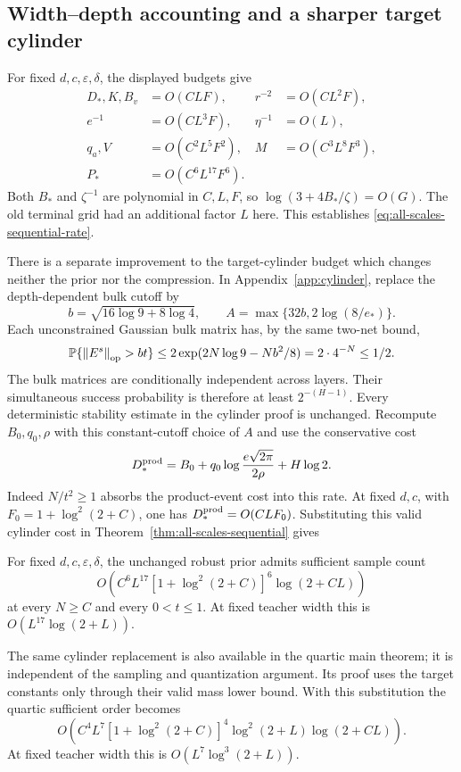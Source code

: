 \subsection{Width--depth accounting and a sharper target cylinder}

For fixed $d,c,\varepsilon,\delta$, the displayed budgets give
\begin{align*}
 D_*,K,B_v&=O(CLF),&r^{-2}&=O(CL^2F),\\
 e^{-1}&=O(CL^3F),&\eta^{-1}&=O(L),\\
 q_a,V&=O(C^2L^5F^2),&M&=O(C^3L^8F^3),\\
 P_*&=O(C^6L^{17}F^6).
\end{align*}
Both $B_*$ and $\zeta^{-1}$ are polynomial in $C,L,F$, so
$\log(3+4B_*/\zeta)=O(G)$. The old terminal grid had an additional
factor $L$ here. This establishes \eqref{eq:all-scales-sequential-rate}.

There is a separate improvement to the target-cylinder budget which
changes neither the prior nor the compression. In
Appendix~\ref{app:cylinder}, replace the depth-dependent bulk cutoff by
\[
 b=\sqrt{16\log9+8\log4},\qquad
 A=\max\{32b,2\log(8/e_*)\}.
\]
Each unconstrained Gaussian bulk matrix has, by the same two-net bound,
\[
 \mathbb P\{\left\|E^s\right\|_{\rm op}>bt\}
 \le2\exp(2N\log9-Nb^2/8)=2\cdot4^{-N}\le1/2.
\]
The bulk matrices are conditionally independent across layers.
Their simultaneous success probability is therefore at least
$2^{-(H-1)}$. Every deterministic stability estimate in the cylinder
proof is unchanged. Recompute $B_0,q_0,\rho$ with this constant-cutoff
choice of $A$ and use the conservative cost
\begin{equation}\label{eq:product-cylinder-cost}
 D_*^{\rm prod}=B_0+q_0\log\frac{e\sqrt{2\pi}}{2\rho}+H\log2.
\end{equation}
Indeed $N/t^2\ge1$ absorbs the product-event cost into this rate.
At fixed $d,c$, with $F_0=1+\log^2(2+C)$, one has
$D_*^{\rm prod}=O(CLF_0)$. Substituting this valid cylinder cost in
Theorem~\ref{thm:all-scales-sequential} gives
\begin{corollary}
\label{cor:all-scales-product-cylinder}
For fixed $d,c,\varepsilon,\delta$, the unchanged robust prior admits
sufficient sample count
\[
 O\!\left(C^6L^{17}[1+\log^2(2+C)]^6\log(2+CL)\right)
\]
at every $N\ge C$ and every $0<t\le1$. At fixed teacher width this is
$O(L^{17}\log(2+L))$.
\end{corollary}
The same cylinder replacement is also available in the quartic main
theorem; it is independent of the sampling and quantization argument.
Its proof uses the target constants only through their valid mass lower
bound. With this substitution the quartic sufficient order becomes
\[
 O\!\left(C^4L^7[1+\log^2(2+C)]^4\log^2(2+L)\log(2+CL)\right).
\]
At fixed teacher width this is $O(L^7\log^3(2+L))$.

